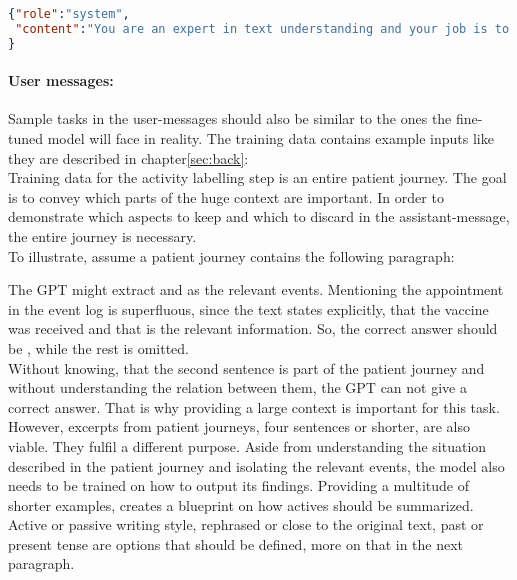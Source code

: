 \begin{lstlisting}[language=json, caption={System message for determining an activies start timestamp}, label={lst:system:starttime}]
{"role":"system",
 "content":"You are an expert in text understanding and your job is to take a given text and a given activity label and to extract a start date to this activity label. Only output the extracted start date! Rely on the context to determine the start date, as it might not be explicitly mentioned."
}
\end{lstlisting}

\paragraph{User messages:}\label{par:user-messages} Sample tasks in the user-messages should also be similar to the ones the fine-tuned model will face in reality. The training data contains example inputs like they are described in chapter\ref{sec:back}:\\
Training data for the activity labelling step is an entire patient journey. The goal is to convey which parts of the huge context are important. In order to demonstrate which aspects to keep and which to discard in the assistant-message, the entire journey is necessary.\\
To illustrate, assume a patient journey contains the following paragraph:
\begin{quote}
\end{quote}
The GPT might extract  and  as the relevant events. Mentioning the appointment in the event log is superfluous, since the text states explicitly, that the vaccine was received and that is the relevant information. So, the correct answer should be , while the rest is omitted.\\
Without knowing, that the second sentence is part of the patient journey and without understanding the relation between them, the GPT can not give a correct answer. That is why providing a large context is important for this task.\\
However, excerpts from patient journeys, four sentences or shorter, are also viable. They fulfil a different purpose. Aside from understanding the situation described in the patient journey and isolating the relevant events, the model also needs to be trained on how to output its findings. Providing a multitude of shorter examples, creates a blueprint on how actives should be summarized. Active or passive writing style, rephrased or close to the original text, past or present tense are options that should be defined, more on that in the next paragraph.\\\\
